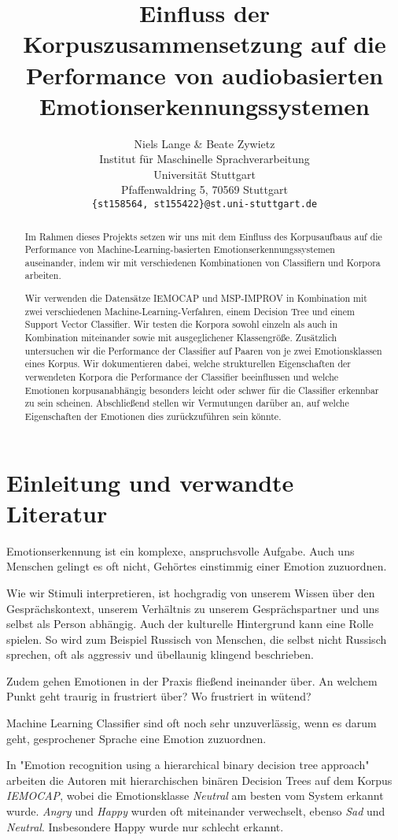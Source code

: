 \documentclass{article} %
\title{Einfluss der Korpuszusammensetzung auf die Performance von audiobasierten Emotionserkennungssystemen}
\author{Niels Lange \& Beate Zywietz\\
Institut für Maschinelle Sprachverarbeitung\\
Universität Stuttgart\\
Pfaffenwaldring 5, 70569 Stuttgart \\
\texttt{\{st158564, st155422\}@st.uni-stuttgart.de} \\
}
\begin{document}
\maketitle
\begin{abstract}
Im Rahmen dieses Projekts setzen wir uns mit dem Einfluss des Korpusaufbaus auf die Performance von Machine-Learning-basierten Emotionserkennungssystemen auseinander, indem wir mit verschiedenen Kombinationen von Classifiern und Korpora arbeiten. 

Wir verwenden die Datensätze IEMOCAP und MSP-IMPROV in Kombination mit zwei verschiedenen Machine-Learning-Verfahren, einem Decision Tree und einem Support Vector Classifier. Wir testen die Korpora sowohl einzeln als auch in Kombination miteinander sowie mit ausgeglichener Klassengröße. Zusätzlich untersuchen wir die Performance der Classifier auf Paaren von je zwei Emotionsklassen eines Korpus. Wir dokumentieren dabei, welche strukturellen Eigenschaften der verwendeten Korpora die Performance der Classifier beeinflussen und welche Emotionen korpusanabhängig besonders leicht oder schwer für die Classifier erkennbar zu sein scheinen. Abschließend stellen wir Vermutungen darüber an, auf welche Eigenschaften der Emotionen dies zurückzuführen sein könnte. 
\end{abstract}

\section{Einleitung und verwandte Literatur}
Emotionserkennung ist ein komplexe, anspruchsvolle Aufgabe. Auch uns Menschen gelingt es oft nicht, Gehörtes einstimmig einer Emotion zuzuordnen. 

Wie wir Stimuli interpretieren, ist hochgradig von unserem Wissen über den Gesprächskontext, unserem Verhältnis zu unserem Gesprächspartner und uns selbst als Person abhängig. Auch der kulturelle Hintergrund kann eine Rolle spielen. So wird zum Beispiel Russisch von Menschen, die selbst nicht Russisch sprechen, oft als aggressiv und übellaunig klingend beschrieben. 

Zudem gehen Emotionen in der Praxis fließend ineinander über. An welchem Punkt geht traurig in frustriert über? Wo frustriert in wütend? 

Machine Learning Classifier sind oft noch sehr unzuverlässig, wenn es darum geht, gesprochener Sprache eine Emotion zuzuordnen. 

In "Emotion recognition using a hierarchical binary decision tree approach"\citep{binat} arbeiten die Autoren mit hierarchischen binären Decision Trees auf dem Korpus \emph{IEMOCAP}, wobei die Emotionsklasse \emph{Neutral} am besten vom System erkannt wurde. \emph{Angry} und \emph{Happy} wurden oft miteinander verwechselt, ebenso \emph{Sad} und \emph{Neutral}. Insbesondere Happy wurde nur schlecht erkannt. 
\end{document}

